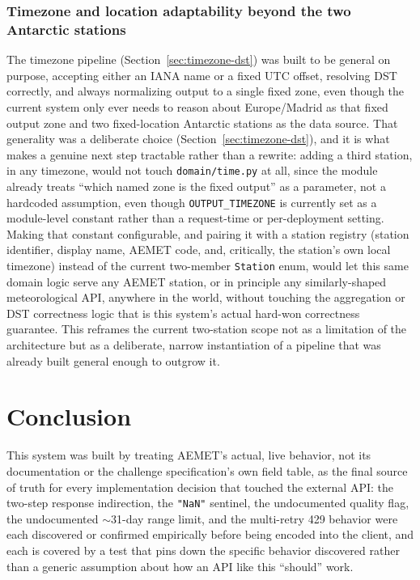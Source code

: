 \documentclass[11pt,a4paper]{article}
\begin{document}
\subsubsection{Timezone and location adaptability beyond the two Antarctic stations}

The timezone pipeline (Section~\ref{sec:timezone-dst}) was built to be
general on purpose, accepting either an IANA name or a fixed UTC offset,
resolving DST correctly, and always normalizing output to a single fixed
zone, even though the current system only ever needs to reason about
Europe/Madrid as that fixed output zone and two fixed-location Antarctic
stations as the data source. That generality was a deliberate choice
(Section~\ref{sec:timezone-dst}), and it is what makes a genuine next step
tractable rather than a rewrite: adding a third station, in any timezone,
would not touch \texttt{domain/time.py} at all, since the module already
treats ``which named zone is the fixed output'' as a parameter, not a
hardcoded assumption, even though \texttt{OUTPUT\_TIMEZONE} is currently
set as a module-level constant rather than a request-time or
per-deployment setting. Making that constant configurable, and pairing it
with a station registry (station identifier, display name, AEMET code,
and, critically, the station's own local timezone) instead of the current
two-member \texttt{Station} enum, would let this same domain logic serve
any AEMET station, or in principle any similarly-shaped meteorological
API, anywhere in the world, without touching the aggregation or DST
correctness logic that is this system's actual hard-won correctness
guarantee. This reframes the current two-station scope not as a
limitation of the architecture but as a deliberate, narrow instantiation
of a pipeline that was already built general enough to outgrow it.

\section{Conclusion}

This system was built by treating AEMET's actual, live behavior, not its
documentation or the challenge specification's own field table, as the
final source of truth for every implementation decision that touched the
external API: the two-step response indirection, the \texttt{"NaN"}
sentinel, the undocumented quality flag, the undocumented $\sim$31-day
range limit, and the multi-retry 429 behavior were each discovered or
confirmed empirically before being encoded into the client, and each is
covered by a test that pins down the specific behavior discovered rather
than a generic assumption about how an API like this ``should'' work.
\end{document}
